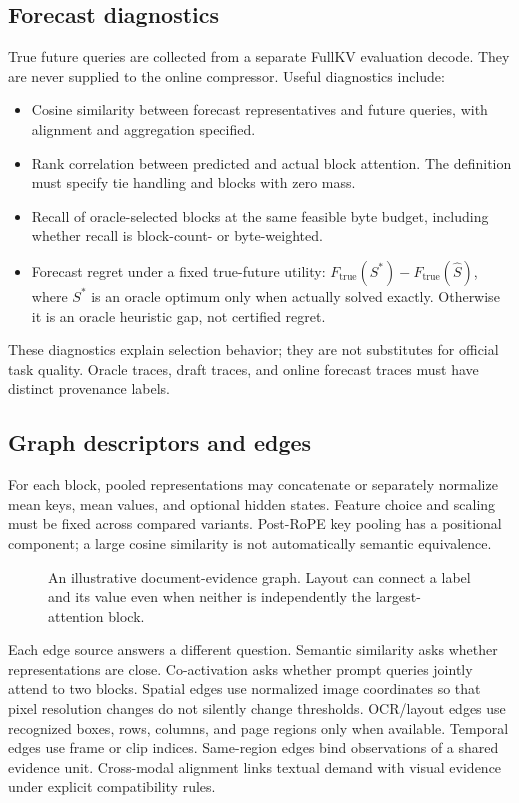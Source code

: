 \subsection{Forecast diagnostics}
True future queries are collected from a separate FullKV evaluation decode.
They are never supplied to the online compressor. Useful diagnostics include:
\begin{itemize}
\item Cosine similarity between forecast representatives and future queries,
with alignment and aggregation specified.
\item Rank correlation between predicted and actual block attention. The
definition must specify tie handling and blocks with zero mass.
\item Recall of oracle-selected blocks at the same feasible byte budget,
including whether recall is block-count- or byte-weighted.
\item Forecast regret under a fixed true-future utility:
$F_{\mathrm{true}}(S^*)-F_{\mathrm{true}}(\widehat S)$, where $S^*$ is an
oracle optimum only when actually solved exactly. Otherwise it is an oracle
heuristic gap, not certified regret.
\end{itemize}
These diagnostics explain selection behavior; they are not substitutes for
official task quality. Oracle traces, draft traces, and online forecast traces
must have distinct provenance labels.

\subsection{Graph descriptors and edges}
For each block, pooled representations may concatenate or separately normalize
mean keys, mean values, and optional hidden states. Feature choice and scaling
must be fixed across compared variants. Post-RoPE key pooling has a positional
component; a large cosine similarity is not automatically semantic equivalence.

\begin{figure}[h]
\centering
\caption{An illustrative document-evidence graph. Layout can connect a label
and its value even when neither is independently the largest-attention block.}
\label{fig:evidence}
\end{figure}

Each edge source answers a different question. Semantic similarity asks whether
representations are close. Co-activation asks whether prompt queries jointly
attend to two blocks. Spatial edges use normalized image coordinates so that
pixel resolution changes do not silently change thresholds. OCR/layout edges
use recognized boxes, rows, columns, and page regions only when available.
Temporal edges use frame or clip indices. Same-region edges bind observations
of a shared evidence unit. Cross-modal alignment links textual demand with
visual evidence under explicit compatibility rules.

